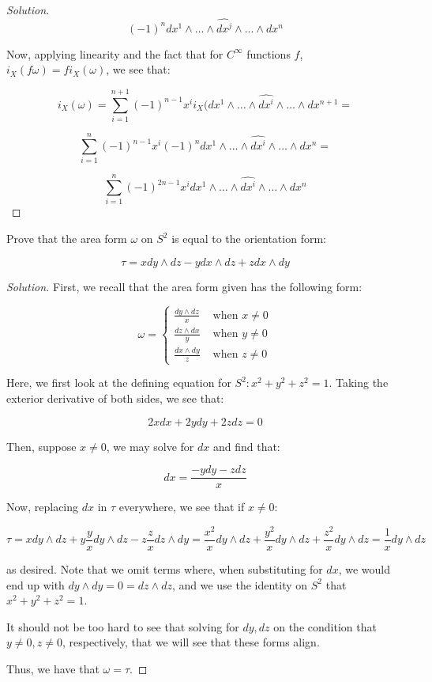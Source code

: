 \documentclass[10pt]{article}
\theoremstyle{nonumberplain}%
\newenvironment{problem}[2][]{\begin{trivlist}
\item[\hskip \labelsep {\bfseries #1}\hskip \labelsep {\bfseries #2.}]}{\end{trivlist}}
\begin{document}
\begin{proof}[Solution]
$$ (-1)^n dx^1 \wedge \dots \wedge \widehat{dx^j} \wedge ... \wedge dx^n $$

Now, applying linearity and the fact that for $C^\infty$ functions $f$, $i_X(f \omega) = f i_X(\omega)$, we see that:

$$i_X(\omega) = \sum_{i=1}^{n+1} (-1)^{n-1} x^i i_X(dx^1 \wedge \dots \wedge \widehat{dx^i} \wedge \dots \wedge dx^{n+1} = $$

$$ \sum_{i=1}^{n} (-1)^{n-1} x^i (-1)^n dx^1 \wedge \dots \wedge \widehat{dx^i} \wedge \dots \wedge dx^n = $$

$$ \sum_{i=1}^{n} (-1)^{2n-1} x^i dx^1 \wedge \dots \wedge \widehat{dx^i} \wedge \dots \wedge dx^n $$





\end{proof}



\begin{problem}{Question 6}

Prove that the area form $\omega$ on $S^2$ is equal to the orientation form:

$$\tau =  x dy \wedge dz -y dx \wedge dz + z dx \wedge dy $$

\end{problem}

\begin{proof}[Solution]

First, we recall that the area form given has the following form:

$$ \omega = \begin{cases} \frac{dy \wedge dz }{x} & \text{ when } x \not = 0 \\ \frac{dz \wedge dx }{y} & \text{ when } y \not = 0 \\  \frac{dx \wedge dy }{z} & \text{ when } z \not = 0\end{cases} $$

Here, we first look at the defining equation for $S^2: x^2 + y^2 + z^2 = 1$. Taking the exterior derivative of both sides, we see that:

$$ 2x dx + 2y dy + 2z dz = 0 $$

Then, suppose $x \not = 0$, we may solve for $dx$ and find that:

$$ dx = \frac{ -y dy - z dz}{x}$$

Now, replacing $dx$ in $\tau$ everywhere, we see that if $x \not = 0$:

$$ \tau =  x dy \wedge dz +y \frac{y}{x} dy \wedge dz - z \frac{z}{x} dz \wedge dy  = \frac{x^2}{x} dy \wedge dz + \frac{y^2}{x} dy \wedge dz + \frac{z^2}{x} dy \wedge dz = \frac{1}{x} dy \wedge dz $$

as desired. Note that we omit terms where, when substituting for $dx$, we would end up with $dy \wedge dy = 0 = dz \wedge dz$, and we use the identity on $S^2$ that $x^2 + y^2 + z^2 = 1$.

It should not be too hard to see that solving for $dy, dz$ on the condition that $y \not = 0, z \not = 0$, respectively, that we will see that these forms align.

Thus, we have that $\omega = \tau$. 

\end{proof}
\end{document}
